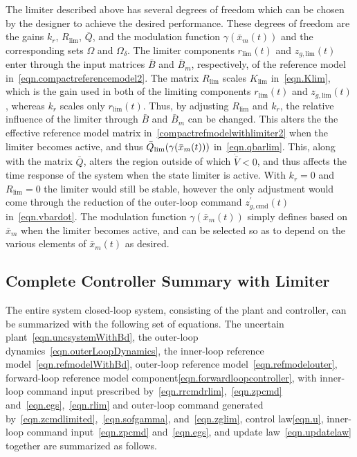 The limiter described above has several degrees of freedom which can be chosen by the designer to achieve the desired performance.
These degrees of freedom are the gains $k_{r}$, $R_{\text{lim}}$, $\bar{Q}$, and the modulation function $\gamma(\bar{x}_{m}(t))$ and the corresponding sets $\Omega$ and $\Omega_{\delta}$.
The limiter components $r_{\text{lim}}(t)$ and $z_{g,\text{lim}}(t)$ enter through the input matrices $\bar{B}$ and $\bar{B}_{m}$, respectively, of the reference model in\ \eqref{eqn.compactreferencemodel2}.
The matrix $R_{\text{lim}}$ scales $K_{\text{lim}}$ in\ \eqref{eqn.Klim}, which is the gain used in both of the limiting components $r_{\text{lim}}(t)$ and $z_{g,\text{lim}}(t)$, whereas $k_{r}$ scales only $r_{\text{lim}}(t)$.
Thus, by adjusting $R_{\text{lim}}$ and $k_{r}$, the relative influence of the limiter through $\bar{B}$ and $\bar{B}_{m}$ can be changed.
This alters the the effective reference model matrix in\ \eqref{compactrefmodelwithlimiter2} when the limiter becomes active, and thus $\bar{Q}_{\rm{\lim}}(\gamma(\bar{x}_{m}(t)))$ in\ \eqref{eqn.qbarlim}.
This, along with the matrix $\bar{Q}$, alters the region outside of which $\dot{\bar{V}}<0$, and thus affects the time response of the system when the state limiter is active.
With $k_{r}=0$ and $R_{\text{lim}}=0$ the limiter would still be stable, however the only adjustment would come through the reduction of the outer-loop command $z_{g,\text{cmd}}^{\prime}(t)$ in\ \eqref{eqn.vbardot}.
The modulation function $\gamma(\bar{x}_{m}(t))$ simply defines based on $\bar{x}_{m}$ when the limiter becomes active, and can be selected so as to depend on the various elements of $\bar{x}_{m}(t)$ as desired.

\subsection{Complete Controller Summary with Limiter}

The entire system closed-loop system, consisting of the plant and controller, can be summarized with the following set of equations.
The uncertain plant\ \eqref{eqn.uncsystemWithBd}, the outer-loop dynamics\ \eqref{eqn.outerLoopDynamics}, the inner-loop reference model\ \eqref{eqn.refmodelWithBd}, outer-loop reference model\ \eqref{eqn.refmodelouter}, forward-loop reference model component\eqref{eqn.forwardloopcontroller}, with inner-loop command input prescribed by\ \eqref{eqn.rrcmdrlim},\ \eqref{eqn.zpcmd} and\ \eqref{eqn.egs},\ \eqref{eqn.rlim} and outer-loop command generated by\ \eqref{eqn.zcmdlimited},\ \eqref{eqn.sofgamma}, and\ \eqref{eqn.zglim}, control law\eqref{eqn.u}, inner-loop command input\ \eqref{eqn.zpcmd} and\ \eqref{eqn.egs}, and update law\ \eqref{eqn.updatelaw} together are summarized as follows.

